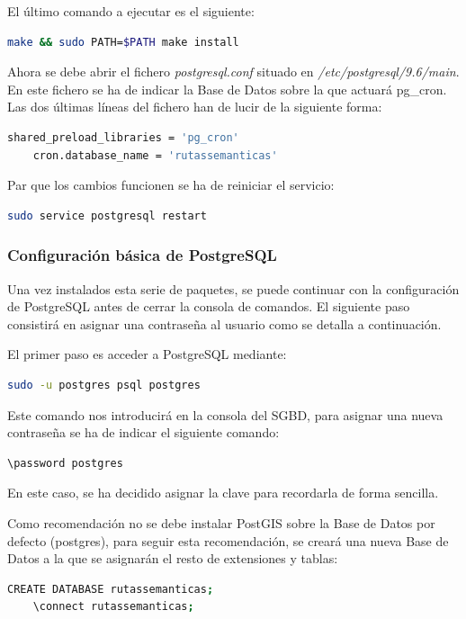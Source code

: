 El último comando a ejecutar es el siguiente:

\begin{lstlisting}[language=bash]
	make && sudo PATH=$PATH make install
\end{lstlisting}

Ahora se debe abrir el fichero \textit{postgresql.conf} situado en \textit{/etc/postgresql/9.6/main}. En este fichero se ha de indicar la Base de Datos sobre la que actuará pg\_cron. Las dos últimas líneas del fichero han de lucir de la siguiente forma:
\begin{lstlisting}[language=bash]
	shared_preload_libraries = 'pg_cron'
	cron.database_name = 'rutassemanticas'
\end{lstlisting}

Par que los cambios funcionen se ha de reiniciar el servicio:
\begin{lstlisting}[language=bash]
	sudo service postgresql restart
\end{lstlisting}

\subsubsection{Configuración básica de PostgreSQL}

Una vez instalados esta serie de paquetes, se puede continuar con la configuración de PostgreSQL antes de cerrar la consola de comandos. El siguiente paso consistirá en asignar una contraseña al usuario   como se detalla a continuación.

El primer paso es acceder a PostgreSQL mediante:
\begin{lstlisting}[language=bash]
	sudo -u postgres psql postgres
\end{lstlisting}
Este comando nos introducirá en la consola del SGBD, para asignar una nueva contraseña se ha de indicar el siguiente comando:

\begin{lstlisting}[language=bash]
	\password postgres
\end{lstlisting}

En este caso, se ha decidido asignar la clave  para recordarla de forma sencilla.

Como recomendación no se debe instalar PostGIS sobre la Base de Datos por defecto (postgres), para seguir esta recomendación, se creará una nueva Base de Datos a la que se asignarán el resto de extensiones y tablas:

\begin{lstlisting}[language=bash]
	CREATE DATABASE rutassemanticas;
	\connect rutassemanticas;
\end{lstlisting}

